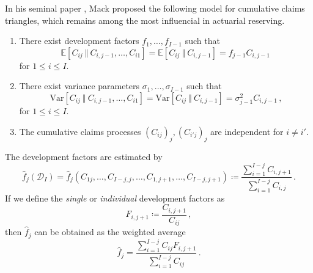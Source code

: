\documentclass[a4paper]{book}
\begin{document}
In his seminal paper \cite{mack:chain-ladder}, Mack proposed the following model for cumulative claims triangles, which remains among the most influencial in actuarial reserving.
\begin{model} \label{model:mack} \leavevmode
  \begin{enumerate}[label=\bf{\textup{(}Mack\arabic*\textup{)}},ref=\textup{(}Mack\arabic*\textup{)}, wide]
    \item \label{assump:mack-expectation} There exist development factors $f_1, \dots, f_{I - 1}$ such that
          \begin{equation}
            \mathbb{E}[C_{ij} \ \Vert \ C_{i, j - 1}, \dots, C_{i1}] = \mathbb{E}[C_{ij} \ \Vert \ C_{i, j - 1}] = f_{j - 1} C_{i, j - 1}\,
          \end{equation}
          for $1 \leq i \leq I$.
    \item \label{assump:mack-variance} There exist variance parameters $\sigma_1, \dots, \sigma_{I - 1}$ such that
          \begin{equation}
            \mathrm{Var}[C_{ij} \ \Vert \ C_{i, j - 1}, \dots, C_{i1}] = \mathrm{Var}[C_{ij} \ \Vert \ C_{i, j - 1}] = \sigma_{j - 1}^2 C_{i, j - 1}\,,
          \end{equation}
          for $1 \leq i \leq I$.
    \item \label{assump:mack-independence} The cumulative claims processes $(C_{ij})_j, (C_{i'j})_j$ are independent for $i \neq i'$.
  \end{enumerate}
\end{model}
The development factors are estimated by
\begin{equation} \label{eq:devfac-estimator}
  \widehat{f}_j(\mathcal{D}_I) = \widehat{f}_j(C_{1j}, \dots, C_{I - j, j}, \dots, C_{1, j + 1}, \dots, C_{I - j, j + 1}) \coloneqq \frac{\sum_{i = 1}^{I - j} C_{i, j + 1}}{\sum_{i = 1}^{I - j} C_{i, j}} \,.
\end{equation}
If we define the \emph{single} or \emph{individual} development factors as
\begin{equation}
  F_{i, j + 1} \coloneqq \frac{C_{i, j + 1}}{C_{ij}} \,,
\end{equation}
then $\widehat{f}_j$ can be obtained as the weighted average
\begin{equation}
  \widehat{f}_j = \frac{\sum_{i = 1}^{I - j} C_{ij} F_{i, j + 1}}{\sum_{i = 1}^{I - j} C_{ij}} \,.
\end{equation}
\end{document}
